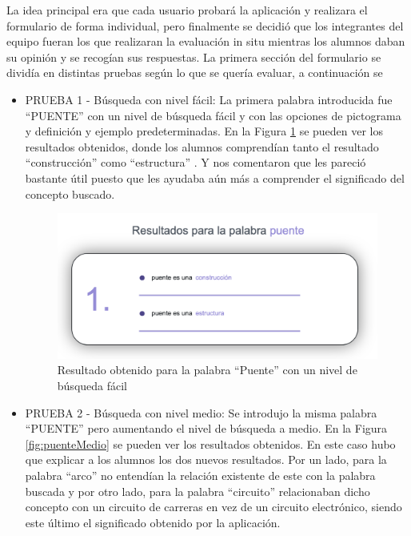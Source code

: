 La idea principal era que cada usuario probará la aplicación y realizara el formulario de forma individual, pero finalmente se decidió que los integrantes del equipo fueran los que realizaran la evaluación in situ mientras los alumnos daban su opinión y se recogían sus respuestas.
La primera sección del formulario se dividía en distintas pruebas según lo que se quería evaluar, a continuación se  
\begin{itemize}
	\item PRUEBA 1 - Búsqueda con nivel fácil: La primera palabra introducida fue ``PUENTE'' con un nivel de búsqueda fácil y con las opciones de pictograma y definición y ejemplo predeterminadas. En la Figura  \ref{fig:puenteFacil} se pueden ver los resultados obtenidos, donde los alumnos comprendían tanto el resultado ``construcción'' como ``estructura'' . Y nos comentaron que les pareció bastante útil puesto que les ayudaba aún más a comprender el significado del concepto buscado.

		\begin{figure}[!h]
		\includegraphics[width=.7\textwidth]{Imagenes/Bitmap/Capitulo4/EvaluacionFinal/1puentefacil.png}
		\centering
		\caption{Resultado obtenido para la palabra ``Puente'' con un nivel de búsqueda fácil}
		\label{fig:puenteFacil}
		\end{figure}
	
	\item PRUEBA 2 - Búsqueda con nivel medio: Se introdujo la misma palabra ``PUENTE'' pero aumentando el nivel de búsqueda a medio. En la Figura \ref{fig:puenteMedio} se pueden ver los resultados obtenidos. En este caso hubo que explicar a los alumnos los dos nuevos resultados. Por un lado, para la palabra ``arco'' no entendían la relación existente de este  con la palabra buscada y por otro lado, para la palabra ``circuito'' relacionaban dicho concepto con un circuito de carreras en vez de un circuito electrónico, siendo este último el significado obtenido por la aplicación.
	

\end{itemize}
